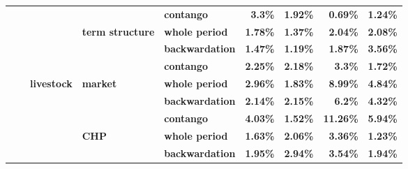 \documentclass[
  authoryear,
  preprint,
  3p]{elsarticle}
\begin{document}
\begin{longtable}[t]{>{}l>{}l>{}l>{}l>{}l>{}r>{}r>{}r>{}r}
\textbf{} & \textbf{} & \textbf{} & \textbf{} & \textbf{contango} & \textcolor[HTML]{4285f4}{\textbf{3.3\%}} & \textcolor[HTML]{4285f4}{\textbf{1.92\%}} & \textcolor[HTML]{4285f4}{\textbf{0.69\%}} & \textcolor[HTML]{4285f4}{\textbf{1.24\%}}\\
\addlinespace
\textbf{} & \textbf{} & \textbf{} & \textbf{term structure} & \textbf{whole period} & \textcolor[HTML]{4285f4}{\textbf{1.78\%}} & \textcolor[HTML]{4285f4}{\textbf{1.37\%}} & \textcolor[HTML]{4285f4}{\textbf{2.04\%}} & \textcolor[HTML]{4285f4}{\textbf{2.08\%}}\\
\textbf{} & \textbf{} & \textbf{} & \textbf{} & \textbf{backwardation} & \textcolor[HTML]{4285f4}{\textbf{1.47\%}} & \textcolor[HTML]{4285f4}{\textbf{1.19\%}} & \textcolor[HTML]{4285f4}{\textbf{1.87\%}} & \textcolor[HTML]{4285f4}{\textbf{3.56\%}}\\
\textbf{} & \textbf{} & \textbf{} & \textbf{} & \textbf{contango} & \textcolor[HTML]{4285f4}{\textbf{2.25\%}} & \textcolor[HTML]{4285f4}{\textbf{2.18\%}} & \textcolor[HTML]{4285f4}{\textbf{3.3\%}} & \textcolor[HTML]{4285f4}{\textbf{1.72\%}}\\
\textbf{} & \textbf{} & \textbf{livestock} & \textbf{market} & \textbf{whole period} & \textcolor[HTML]{4285f4}{\textbf{2.96\%}} & \textcolor[HTML]{4285f4}{\textbf{1.83\%}} & \textcolor[HTML]{4285f4}{\textbf{8.99\%}} & \textcolor[HTML]{4285f4}{\textbf{4.84\%}}\\
\textbf{} & \textbf{} & \textbf{} & \textbf{} & \textbf{backwardation} & \textcolor[HTML]{4285f4}{\textbf{2.14\%}} & \textcolor[HTML]{4285f4}{\textbf{2.15\%}} & \textcolor[HTML]{4285f4}{\textbf{6.2\%}} & \textcolor[HTML]{4285f4}{\textbf{4.32\%}}\\
\addlinespace
\textbf{} & \textbf{} & \textbf{} & \textbf{} & \textbf{contango} & \textcolor[HTML]{4285f4}{\textbf{4.03\%}} & \textcolor[HTML]{4285f4}{\textbf{1.52\%}} & \textcolor[HTML]{4285f4}{\textbf{11.26\%}} & \textcolor[HTML]{4285f4}{\textbf{5.94\%}}\\
\textbf{} & \textbf{} & \textbf{} & \textbf{CHP} & \textbf{whole period} & \textcolor[HTML]{4285f4}{\textbf{1.63\%}} & \textcolor[HTML]{4285f4}{\textbf{2.06\%}} & \textcolor[HTML]{4285f4}{\textbf{3.36\%}} & \textcolor[HTML]{4285f4}{\textbf{1.23\%}}\\
\textbf{} & \textbf{} & \textbf{} & \textbf{} & \textbf{backwardation} & \textcolor[HTML]{4285f4}{\textbf{1.95\%}} & \textcolor[HTML]{4285f4}{\textbf{2.94\%}} & \textcolor[HTML]{4285f4}{\textbf{3.54\%}} & \textcolor[HTML]{4285f4}{\textbf{1.94\%}}\\

\end{longtable}
\end{document}

